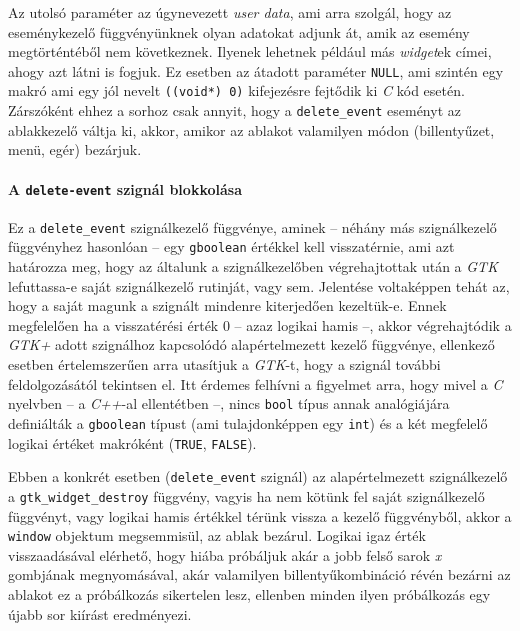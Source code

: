 \begin{description}
 Az utolsó paraméter az úgynevezett \textit{user data}, ami arra szolgál, hogy az eseménykezelő függvényünknek olyan adatokat adjunk át, amik az esemény megtörténtéből nem következnek. Ilyenek lehetnek például más \textit{widget}ek címei, ahogy azt látni is fogjuk. Ez esetben az átadott paraméter \texttt{NULL}, ami szintén egy makró ami egy jól nevelt \texttt{((void*) 0)} kifejezésre fejtődik ki \textit{C} kód esetén. Zárszóként ehhez a sorhoz csak annyit, hogy a \texttt{delete\_event} eseményt az ablakkezelő váltja ki, akkor, amikor az ablakot valamilyen módon (billentyűzet, menü, egér) bezárjuk.
\end{description}

\paragraph{A \texttt{delete-event} szignál blokkolása}

\begin{description}
 \item[\ref{gtksignalc:callbackdeleteevent}. sor] Ez a \texttt{delete\_event} szignálkezelő függvénye, aminek -- néhány más szignálkezelő függvényhez hasonlóan -- egy \texttt{gboolean} értékkel kell visszatérnie, ami azt határozza meg, hogy az általunk a szignálkezelőben végrehajtottak után a \textit{GTK} lefuttassa-e saját szignálkezelő rutinját, vagy sem. Jelentése voltaképpen tehát az, hogy a saját magunk a szignált mindenre kiterjedően kezeltük-e. Ennek megfelelően ha a visszatérési érték 0 -- azaz logikai hamis --, akkor végrehajtódik a \textit{GTK+} adott szignálhoz kapcsolódó alapértelmezett kezelő függvénye, ellenkező esetben értelemszerűen arra utasítjuk a \textit{GTK}-t, hogy a szignál további feldolgozásától tekintsen el. Itt érdemes felhívni a figyelmet arra, hogy mivel a \textit{C} nyelvben -- a \textit{C++}-al ellentétben --, nincs \texttt{bool} típus annak analógiájára definiálták a \texttt{gboolean} típust (ami tulajdonképpen egy \texttt{int}) és a két megfelelő logikai értéket makróként (\texttt{TRUE}, \texttt{FALSE}).

 Ebben a konkrét esetben (\texttt{delete\_event} szignál) az alapértelmezett szignálkezelő a \texttt{gtk\_widget\_destroy} függvény, vagyis ha nem kötünk fel saját szignálkezelő függvényt, vagy logikai hamis értékkel térünk vissza a kezelő függvényből, akkor a \texttt{window} objektum megsemmisül, az ablak bezárul. Logikai igaz érték visszaadásával elérhető, hogy hiába próbáljuk akár a jobb felső sarok \textit{x} gombjának megnyomásával, akár valamilyen billentyűkombináció révén bezárni az ablakot ez a próbálkozás sikertelen lesz, ellenben minden ilyen próbálkozás egy újabb sor kiírást eredményezi. 
\end{description}

